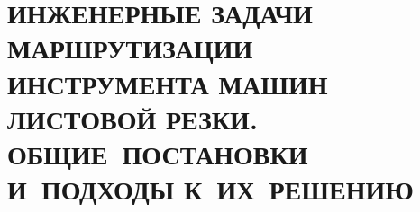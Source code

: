 

\part{\MakeUppercase{
  Инженерные задачи
  маршрутизации инструмента машин листовой резки.
  Общие~постановки
  и~подходы к~их~решению
}}



